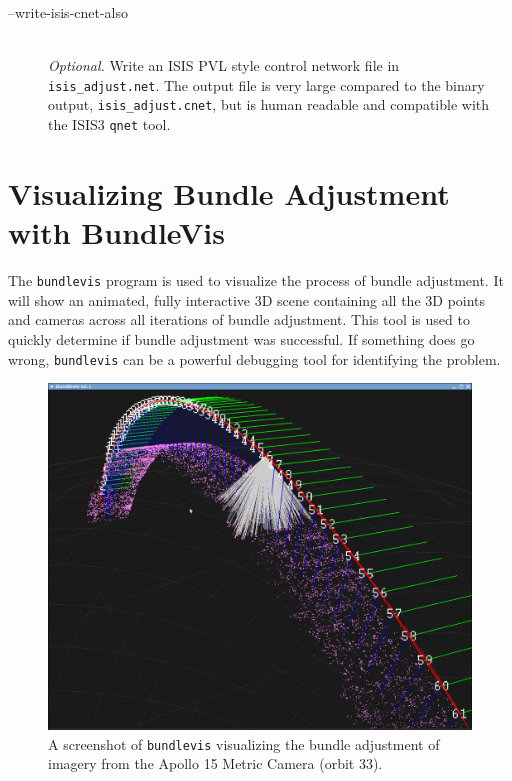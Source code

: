 \begin{description}
\item[--write-isis-cnet-also] \hfill \\

  \emph{Optional.} Write an ISIS PVL style control network file in
  \texttt{isis\_adjust.net}. The output file is very large compared to
  the binary output, \texttt{isis\_adjust.cnet}, but is human readable
  and compatible with the ISIS3 \texttt{qnet} tool.

\end{description}


\section{Visualizing Bundle Adjustment with BundleVis}

The \texttt{bundlevis} program is used to visualize the process of
bundle adjustment. It will show an animated, fully interactive 3D
scene containing all the 3D points and cameras across all iterations
of bundle adjustment.  This tool is used to quickly determine if
bundle adjustment was successful.  If something does go wrong,
\texttt{bundlevis} can be a powerful debugging tool for identifying
the problem.

\begin{figure}[t!]
  \begin{center}
  \includegraphics[width=5in]{images/bundlevis_apollo.png}
  \end{center}
  \caption{ A screenshot of \texttt{bundlevis} visualizing the bundle
    adjustment of imagery from the Apollo 15 Metric Camera (orbit
    33). }
  \label{fig:bundlevis}
\end{figure}

